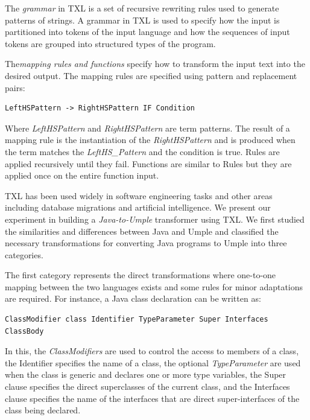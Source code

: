 The \textit{grammar} in TXL is a set of recursive rewriting rules used to generate patterns of strings. A grammar in TXL is used to specify how the input is partitioned into tokens of the input language and how the sequences of input tokens are grouped into structured types of the program. 

The\textit{mapping rules and functions} specify how to transform the input text into the desired output. The mapping rules are specified using pattern and replacement pairs: 

\vspace{\baselineskip}
\begin{lstlisting}[style=umplePlain]
LeftHSPattern -> RightHSPattern IF Condition
\end{lstlisting}

Where \textit{LeftHSPattern} and \textit{RightHSPattern} are term patterns. The result of a mapping rule is the instantiation of the \textit{RightHSPattern} and is produced when the term matches the \textit{LeftHS\_Pattern} and the condition is true. Rules are applied recursively until they fail. Functions are similar to Rules but they are applied once on the entire function input.

TXL has been used widely in software engineering tasks and other areas including database migrations and artificial intelligence. We present our experiment in building a \textit{Java-to-Umple} transformer using TXL. We first studied the similarities and differences between Java and Umple and classified the necessary transformations for converting Java programs to Umple into three categories.

The first category represents the direct transformations where one-to-one mapping between the two languages exists and some rules for minor adaptations are required. For instance, a Java class declaration can be written as: 

\vspace{\baselineskip}
\begin{lstlisting}[style=umplePlain]
ClassModifier class Identifier TypeParameter Super Interfaces ClassBody
\end{lstlisting}

In this, the \textit{ClassModifiers} are used to control the access to members of a class, the Identifier specifies the name of a class, the optional \textit{TypeParameter} are used when the class is generic and declares one or more type variables, the Super clause specifies the direct superclasses of the current class, and the Interfaces clause specifies the name of the interfaces that are direct super-interfaces of the class being declared.

